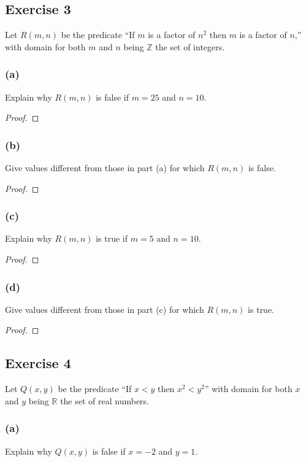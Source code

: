 \documentclass[14pt]{extarticle}
\newcommand{\R}{\mathbb{R}}
\newcommand{\Z}{\mathbb{Z}}
\begin{document}
\subsection{Exercise 3}
Let $R(m, n)$ be the predicate “If $m$ is a factor of $n^2$ then $m$ is a factor of $n$,” with domain for both $m$ and $n$ being $\Z$ the set of integers.

\subsubsection{(a)}
Explain why $R(m, n)$ is false if $m = 25$ and $n = 10$.
\begin{proof}

\end{proof}

\subsubsection{(b)}
Give values different from those in part (a) for which $R(m, n)$ is false.

\begin{proof}

\end{proof}

\subsubsection{(c)}
Explain why $R(m, n)$ is true if $m = 5$ and $n = 10$.

\begin{proof}

\end{proof}

\subsubsection{(d)}
Give values different from those in part (c) for which $R(m, n)$ is true.

\begin{proof}

\end{proof}

\subsection{Exercise 4}
Let $Q(x, y)$ be the predicate “If $x < y$ then $x^2 < y^2$” with domain for both $x$ and $y$ being $\R$ the set of real numbers.

\subsubsection{(a)}
Explain why $Q(x, y)$ is false if $x = -2$ and $y = 1$.
\end{document}
